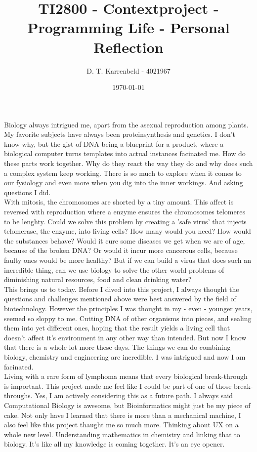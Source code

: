 \documentclass{article}
\title{TI2800 - Contextproject - Programming Life - Personal Reflection}
\author{D. T. Karrenbeld - 4021967}
\date{\today}
\begin{document}
	\maketitle
Biology always intrigued me, apart from the asexual reproduction among plants. My favorite subjects have always been proteinsynthesis and genetics. I don't know why, but the gist of DNA being a blueprint for a product, where a biological computer turns templates into actual instances facinated me. How do these parts work together. Why do they react the way they do and why does such a complex system keep working. There is so much to explore when it comes to our fysiology and even more when you dig into the inner workings. And asking questions I did.\\

With mitosis, the chromosomes are shorted by a tiny amount. This affect is reversed with reproduction where a enzyme ensures the chromosomes telomeres to be lenghty. Could we solve this problem by creating a 'safe virus' that injects telomerase, the enzyme, into living cells? How many would you need? How would the substances behave? Would it cure some diseases we get when we are of age, because of the broken DNA? Or would it incur more cancerous cells, because faulty ones would be more healthy? But if we can build a virus that does such an incredible thing, can we use biology to solve the other world problems of diminishing natural resources, food and clean drinking water? \\

This brings us to today. Before I dived into this project, I always thought the questions and challenges mentioned above were best answered by the field of biotechnology. However the principles I was thought in my - even - younger years, seemed so sloppy to me. Cutting DNA of other organisms into pieces, and sealing them into yet different ones, hoping that the result yields a living cell that doesn't affect it's environment in any other way than intended. But now I know that there is a whole lot more these days. The things we can do combining biology, chemistry and engineering are incredible. I was intrigued and now I am facinated. \\

Living with a rare form of lymphoma means that every biological break-through is important. This project made me feel like I could be part of one of those break-throughs. Yes, I am actively considering this as a future path. I always said Computational Biology is awesome, but Bioinformatics might just be my piece of cake. Not only have I learned that there is more than a mechanical machine, I also feel like this project thaught me so much more. Thinking about UX on a whole new level. Understanding mathematics in chemistry and linking that to biology. It's like all my knowledge is coming together. It's an eye opener.\\
\end{document}
